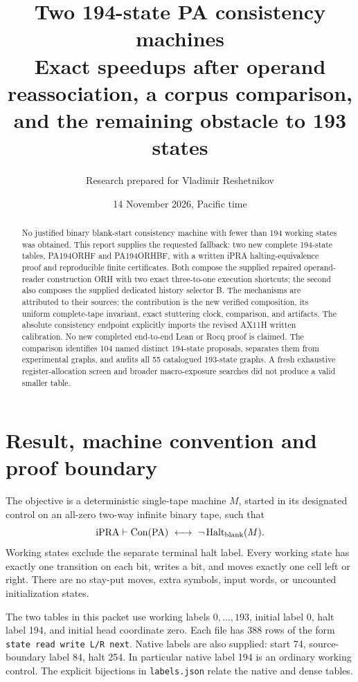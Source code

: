 \documentclass[11pt]{article}
\title{Two 194-state PA consistency machines\\[4pt]\large Exact speedups after operand reassociation, a corpus comparison,\\and the remaining obstacle to 193 states}
\author{Research prepared for Vladimir Reshetnikov}
\date{14 November 2026, Pacific time}
\newcommand{\ipra}{\mathrm{iPRA}}
\newcommand{\PA}{\mathrm{PA}}
\newcommand{\Con}{\operatorname{Con}}
\newcommand{\Halt}{\operatorname{Halt}}
\begin{document}
\maketitle
\begin{abstract}
No justified binary blank-start consistency machine with fewer than 194 working states was obtained. This report supplies the requested fallback: two new complete 194-state tables, PA194ORHF and PA194ORHBF, with a written iPRA halting-equivalence proof and reproducible finite certificates. Both compose the supplied repaired operand-reader construction ORH with two exact three-to-one execution shortcuts; the second also composes the supplied dedicated history selector B. The mechanisms are attributed to their sources: the contribution is the new verified composition, its uniform complete-tape invariant, exact stuttering clock, comparison, and artifacts. The absolute consistency endpoint explicitly imports the revised AX11H written calibration. No new completed end-to-end Lean or Rocq proof is claimed. The comparison identifies 104 named distinct 194-state proposals, separates them from experimental graphs, and audits all 55 catalogued 193-state graphs. A fresh exhaustive register-allocation screen and broader macro-exposure searches did not produce a valid smaller table.
\end{abstract}
\tableofcontents
\newpage

\section{Result, machine convention and proof boundary}
The objective is a deterministic single-tape machine $M$, started in its designated control on an all-zero two-way infinite binary tape, such that
\[
             \ipra\vdash \Con(\PA)\ \longleftrightarrow\ \neg\Halt_{\rm blank}(M).
\]
Working states exclude the separate terminal halt label. Every working state has exactly one transition on each bit, writes a bit, and moves exactly one cell left or right. There are no stay-put moves, extra symbols, input words, or uncounted initialization states.

The two tables in this packet use working labels $0,\ldots,193$, initial label 0, halt label 194, and initial head coordinate zero. Each file has 388 rows of the form \texttt{state read write L/R next}. Native labels are also supplied: start 74, source-boundary label 84, halt 254. In particular native label 194 is an ordinary working control. The explicit bijections in \texttt{labels.json} relate the native and dense tables.
\end{document}
